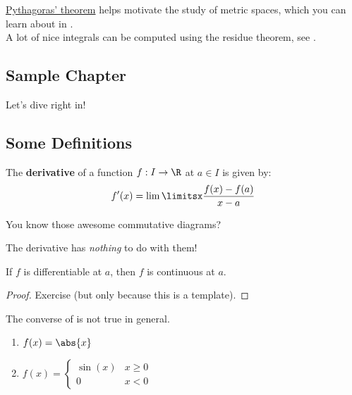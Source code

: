 \hyperref[pythagoras]{Pythagoras' theorem} helps motivate the study of metric spaces, which you can learn about in \cite{sekhon}.\\

A lot of nice integrals can be computed using the residue theorem, see \cite[Section 5.2]{taylor}.


\begin{verbatim*}
    \section{Sample Chapter}
Let's dive right in!

\subsection{Some Definitions}
\begin{definition}
The \textbf{derivative} of a function $f:I\to\R$ at $a\in I$ is given by:
\begin{equation*}
    f'(x)=\lim\limitsx\frac{f(x)-f(a)}{x-a}
\end{equation*}
\end{definition}

\begin{center}
You know those awesome commutative diagrams?


The derivative has \emph{nothing} to do with them!
\end{center}

\begin{proposition}\label{diffcont}
If $f$ is differentiable at $a$, then $f$ is continuous at $a$.
\end{proposition}
\begin{proof}
Exercise (but only because this is a template).
\end{proof}

The converse of  is not true in general.

\begin{examples}\leavevmode % This is needed to start the list in the next line so it won't be misaligned
\begin{enumerate}
    \item $f(x)=\abs{x}$
    \item $f(x)=\begin{cases} \sin(x) & x\ge 0 \\ 0 & x<0 \end{cases}$
\end{enumerate}
\end{examples}


\end{verbatim*}
